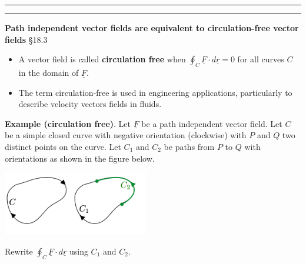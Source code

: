 \documentclass[12pt,letterpaper,noanswers]{exam}
\newcommand{\mb}[1]{\underline{#1}}
\begin{document}
\vspace{0.2cm}
\hrule
\vspace{0.2cm}

\vspace{0.2cm}
\hrule
\vspace{0.2cm}


\noindent\textbf{Path independent vector fields are equivalent to circulation-free vector fields} \S 18.3
\begin{tcolorbox}
\begin{itemize}
\itemsep0em
    \item A vector field is called \textbf{circulation free} when $\displaystyle\oint_C \mb F\cdot d\mb r = 0$ for all curves $C$ in the domain of $\mb F$.
    \item The term circulation-free is used in engineering applications, particularly to describe velocity vectors fields in fluids.
\end{itemize}
\end{tcolorbox} 



\noindent\textbf{Example (circulation free)}.  Let $\mb F$ be a path independent vector field.  Let $C$ be a simple closed curve with negative orientation (clockwise) with $P$ and $Q$ two distinct points on the curve.  Let $C_1$ and $C_2$ be paths from $P$ to $Q$ with orientations as shown in the figure below.

\begin{multicols}{2}
\includegraphics[width=2.5in]{img/C27p2.png}

Rewrite $\displaystyle\oint_C \mb F\cdot d\mb r$  using $C_1$ and $C_2$. 
\end{multicols}
\vspace{0.5in}






\end{document}
